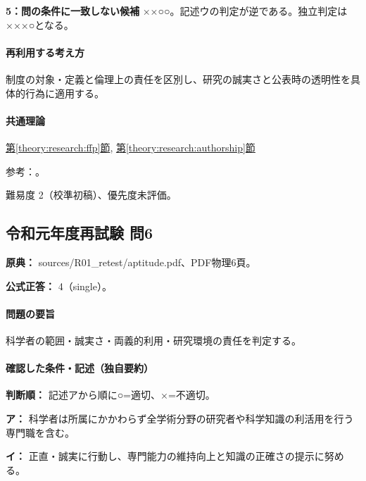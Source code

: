 \noindent\textbf{5：問の条件に一致しない候補} ××○○。記述ウの判定が逆である。独立判定は×××○となる。\par

\paragraph{再利用する考え方} 制度の対象・定義と倫理上の責任を区別し、研究の誠実さと公表時の透明性を具体的行為に適用する。

\paragraph{共通理論} \hyperref[theory:research:ffp]{第\ref*{theory:research:ffp}節}, \hyperref[theory:research:authorship]{第\ref*{theory:research:authorship}節}

\par 参考：\cite{mext_misconduct2014,jsps_integrity2025}。

\par 難易度 2（校準初稿）、優先度未評価。

\subsection{令和元年度再試験 問6}
\label{q:r01-ret-apt-06}

\noindent\textbf{原典：} sources/R01\_retest/aptitude.pdf、PDF物理6頁。

\textbf{公式正答：} 4（single）。

\paragraph{問題の要旨} 科学者の範囲・誠実さ・両義的利用・研究環境の責任を判定する。

\paragraph{確認した条件・記述（独自要約）}\mbox{}\par

\noindent\textbf{判断順：} 記述アから順に○=適切、×=不適切。\par

\noindent\textbf{ア：} 科学者は所属にかかわらず全学術分野の研究者や科学知識の利活用を行う専門職を含む。\par

\noindent\textbf{イ：} 正直・誠実に行動し、専門能力の維持向上と知識の正確さの提示に努める。\par

